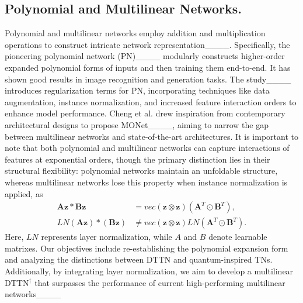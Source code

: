 \subsection{Polynomial and Multilinear Networks.}
Polynomial and multilinear networks employ addition and multiplication operations to construct intricate network representation____. 
Specifically, the pioneering polynomial network (PN)____ modularly constructs higher-order expanded polynomial forms of inputs and then training them end-to-end. It has shown good results in image recognition and generation tasks.
The study____ introduces regularization terms for PN, incorporating techniques like data augmentation, instance normalization, and increased feature interaction orders to enhance model performance.
Cheng et al. drew inspiration from contemporary architectural designs to propose MONet____, aiming to narrow the gap between multilinear networks and state-of-the-art architectures.
It is important to note that both polynomial and multilinear networks can capture interactions of features at exponential orders, though the primary distinction lies in their structural flexibility: polynomial networks maintain an unfoldable structure, whereas multilinear networks lose this property when instance normalization is applied, as
\begin{equation}\begin{split}
\boldsymbol{A}\boldsymbol{z} * \boldsymbol{B}\boldsymbol{z} &= vec(\boldsymbol{z} \otimes \boldsymbol{z})(\boldsymbol{A}^T\odot \boldsymbol{B}^T),\\
LN(\boldsymbol{A}\boldsymbol{z} ) * (\boldsymbol{B}\boldsymbol{z}) &\neq vec(\boldsymbol{z} \otimes \boldsymbol{z})LN(\boldsymbol{A}^T\odot \boldsymbol{B}^T).
\label{eq2}
\end{split}\end{equation}
Here, $LN$ represents layer normalization, while $A$ and $B$ denote learnable matrixes.
Our objectives include re-establishing the polynomial expansion form and analyzing the distinctions between DTTN and quantum-inspired TNs. Additionally, by integrating layer normalization, we aim to develop a multilinear DTTN$^\dagger$ that surpasses the performance of current high-performing multilinear networks____
